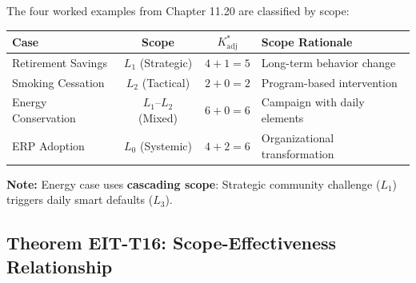 \begin{tcolorbox}[colback=gray!5!white, colframe=gray!75!black,
    title=\textbf{EIT-EMP-3-APP: Scope Classification of Chapter 11 Examples}]

The four worked examples from Chapter 11.20 are classified by scope:

\begin{center}
\begin{tabular}{lccl}
\toprule
\textbf{Case} & \textbf{Scope} & \textbf{$K^*_{\text{adj}}$} & \textbf{Scope Rationale} \\
\midrule
Retirement Savings & $L_1$ (Strategic) & $4 + 1 = 5$ & Long-term behavior change \\
Smoking Cessation & $L_2$ (Tactical) & $2 + 0 = 2$ & Program-based intervention \\
Energy Conservation & $L_1$--$L_2$ (Mixed) & $6 + 0 = 6$ & Campaign with daily elements \\
ERP Adoption & $L_0$ (Systemic) & $4 + 2 = 6$ & Organizational transformation \\
\bottomrule
\end{tabular}
\end{center}

\textbf{Note:} Energy case uses \textbf{cascading scope}: Strategic community challenge ($L_1$) triggers daily smart defaults ($L_3$).

\end{tcolorbox}

\subsection{Theorem EIT-T16: Scope-Effectiveness Relationship}
\label{subsec:scope-theorem}

